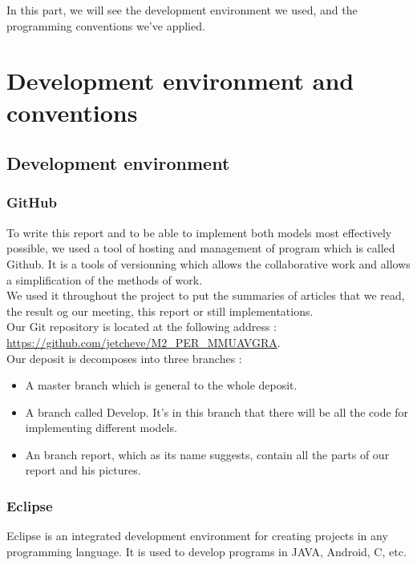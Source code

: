 In this part, we will see the development environment we used, and the programming conventions we've applied.

\chapter{Development environment and conventions}

\section{Development environment}

\subsection{GitHub}

To write this report and to be able to implement both models most effectively possible, we used a tool of hosting and management of program which is called Github. It is a tools of versionning which allows the collaborative work and allows a simplification of the methods of work.\\
We used it throughout the project to put the summaries of articles that we read, the result og our meeting, this report or still implementations.\\
Our Git repository is located at the following address : \\
\url{https://github.com/jetcheve/M2\_PER\_MMUAVGRA}.\\

Our deposit is decomposes into three branches :

\begin{itemize}
\item A master branch which is general to the whole deposit.
\item A branch called Develop. It's in this branch that there will be all the code for implementing different models.
\item An branch report, which as its name suggests, contain all the parts of our report and his pictures.
\end{itemize}

\subsection{Eclipse}

Eclipse is an integrated development environment for creating projects in any programming language. It is used to develop programs in JAVA, Android, C, etc.\\

